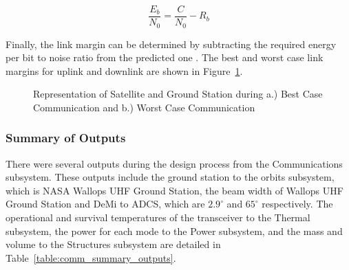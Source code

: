 \documentclass[12pt]{article}
\begin{document}
\begin{equation}\label{eq:comm-energy-to-noise}
\frac{E_b}{N_0} = \frac{C}{N_0} - R_b 
\end{equation}

Finally, the link margin can be determined by subtracting the required energy per bit to noise ratio from the predicted one \cite[p.~478]{SMAD}. The best and worst case link margins for uplink and downlink are shown in Figure~\ref{fig:comm_cases}.


\begin{figure}
\hfill
{}
\hfill
{}
\hfill
\caption{Representation of Satellite and Ground Station during a.) Best Case Communication and b.) Worst Case Communication}
\label{fig:comm_cases}
\end{figure}
		
\subsubsection{Summary of Outputs}

There were several outputs during the design process from the Communications subsystem. These outputs include the ground station to the orbits subsystem, which is NASA Wallops UHF Ground Station, the beam width of Wallops UHF Ground Station and DeMi to ADCS, which are $2.9^\circ$ and $65^\circ$ respectively. The operational and survival temperatures of the transceiver to the Thermal subsystem, the power for each mode to the Power subsystem, and the mass and volume to the Structures subsystem are detailed in Table~\ref{table:comm_summary_outputs}.
	
\end{document}
